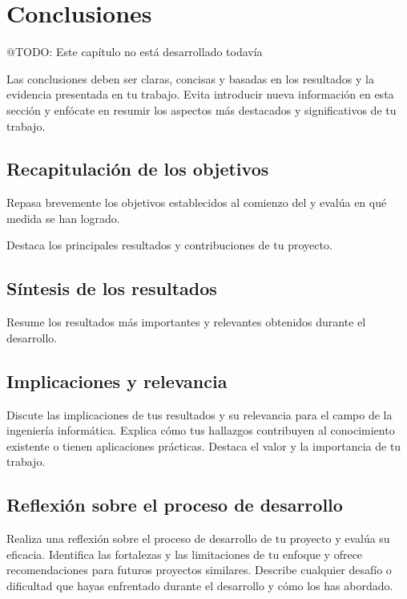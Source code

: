     \chapter{Conclusiones}\label{ch:chapter_6}

\colorbox{color_highlight}{@TODO: Este capítulo no está desarrollado todavía}

Las conclusiones deben ser claras, concisas y basadas en los resultados y la evidencia presentada en tu trabajo.
Evita introducir nueva información en esta sección y enfócate en
resumir los aspectos más destacados y significativos de tu trabajo.


\section{Recapitulación de los objetivos}

Repasa brevemente los objetivos establecidos al comienzo del y evalúa en qué medida se
han logrado.

Destaca los principales resultados y contribuciones de tu proyecto.


\section{Síntesis de los resultados}

Resume los resultados más importantes y relevantes obtenidos durante el desarrollo.


\section{Implicaciones y relevancia}


Discute las implicaciones de tus resultados y su relevancia para el campo
de la ingeniería informática.
Explica cómo tus hallazgos contribuyen al conocimiento existente o tienen aplicaciones prácticas.
Destaca el valor y la importancia de tu trabajo.


\section{Reflexión sobre el proceso de desarrollo}

Realiza una reflexión sobre el proceso de desarrollo de tu proyecto y evalúa
su eficacia.
Identifica las fortalezas y las limitaciones de tu enfoque y ofrece recomendaciones para futuros proyectos similares.
Describe cualquier desafío o dificultad que hayas enfrentado durante el desarrollo y cómo los has abordado.


